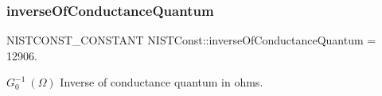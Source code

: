 \subsubsection{\texorpdfstring{inverse\+Of\+Conductance\+Quantum}{inverseOfConductanceQuantum}}
{\footnotesize\ttfamily N\+I\+S\+T\+C\+O\+N\+S\+T\+\_\+\+C\+O\+N\+S\+T\+A\+NT N\+I\+S\+T\+Const\+::inverse\+Of\+Conductance\+Quantum = 12906.}

$G_0^{-1} \ (\Omega)$ Inverse of conductance quantum in ohms. 